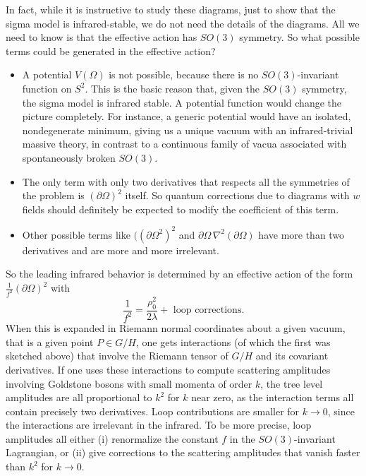 In fact, while it is instructive to study these diagrams, just to show
that the sigma model is infrared-stable, we do not need the details
of the diagrams.  All we need to know is that the effective action
has $SO(3)$ symmetry.
So what possible terms could be generated in the effective action?
\begin{itemize}

\item A potential $V(\Omega)$  is not possible, because there is no
$SO(3)$-invariant function on $S^2$.  This is the basic reason that, given
the $SO(3)$ symmetry, the sigma model is infrared stable.  A potential
function would change the picture completely.  For instance, a generic
potential would have an isolated, nondegenerate minimum, giving us
a unique vacuum with an infrared-trivial massive theory, in contrast
to a continuous family of vacua associated with spontaneously broken $SO(3)$.

\item
The only term with only two derivatives that respects all the symmetries
of the problem is $(\partial\Omega)^2$ itself.  So quantum corrections
due to diagrams with $w$ fields should definitely be expected to modify
the coefficient of this term.

\item Other possible terms like $((\partial\Omega^2)^2$ and
$\partial\Omega\,\nabla^2(\partial\Omega)$ have more than two derivatives
and are more and more irrelevant.
\end{itemize}

So the leading infrared behavior is determined by an effective action of 
the form
$\frac1{f^2}(\partial\Omega)^2$ with
$$\frac1{f^2}=\frac{\rho_0^2}{2\lambda}+\text{ loop corrections}.$$
When this is expanded in Riemann normal coordinates about a given
vacuum, that is a given point $P\in G/H$, one gets interactions
(of which the first was sketched above) that involve the Riemann tensor
of $G/H$ and its covariant derivatives.
If one uses these interactions to compute scattering amplitudes
involving Goldstone bosons with small momenta of order $k$, the
tree level amplitudes are all proportional to $k^2$ for $k$ near zero,
as the interaction terms all contain precisely two derivatives.  
Loop contributions are smaller for $k\to 0$, since the interactions
are irrelevant in the infrared.  To be more precise,
loop
amplitudes all either (i) renormalize the constant $f$ in the
$SO(3)$-invariant Lagrangian, or (ii) give corrections to the scattering
amplitudes that vanish faster than $k^2$ for $k\to 0$.

